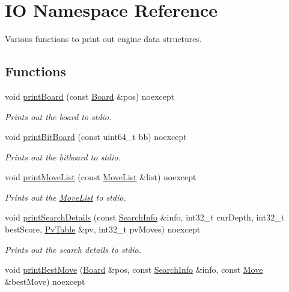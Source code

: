 \hypertarget{namespaceIO}{}\section{IO Namespace Reference}
\label{namespaceIO}


Various functions to print out engine data structures.  


\subsection*{Functions}
\begin{DoxyCompactItemize}
\item 
void \mbox{\hyperlink{namespaceIO_a4a4d2d4f2b6ab5c67e9c087d93db774a}{print\+Board}} (const \mbox{\hyperlink{classBoard}{Board}} \&pos) noexcept
\begin{DoxyCompactList}\small\item\em Prints out the board to stdio. \end{DoxyCompactList}\item 
void \mbox{\hyperlink{namespaceIO_a40b1f9e06e7f1fa9ad6d03382998a704}{print\+Bit\+Board}} (const uint64\+\_\+t bb) noexcept
\begin{DoxyCompactList}\small\item\em Prints out the bitboard to stdio. \end{DoxyCompactList}\item 
void \mbox{\hyperlink{namespaceIO_a34aa1665a2c3f474c1073f0ff9b67db0}{print\+Move\+List}} (const \mbox{\hyperlink{classMoveList}{Move\+List}} \&list) noexcept
\begin{DoxyCompactList}\small\item\em Prints out the \mbox{\hyperlink{classMoveList}{Move\+List}} to stdio. \end{DoxyCompactList}\item 
void \mbox{\hyperlink{namespaceIO_a029095064998d6f3bcf6022cf2876705}{print\+Search\+Details}} (const \mbox{\hyperlink{structSearchInfo}{Search\+Info}} \&info, int32\+\_\+t cur\+Depth, int32\+\_\+t best\+Score, \mbox{\hyperlink{classPvTable}{Pv\+Table}} \&pv, int32\+\_\+t pv\+Moves) noexcept
\begin{DoxyCompactList}\small\item\em Prints out the search details to stdio. \end{DoxyCompactList}\item 
void \mbox{\hyperlink{namespaceIO_a308ab394cf5fd18910986fbe556d01bb}{print\+Best\+Move}} (\mbox{\hyperlink{classBoard}{Board}} \&pos, const \mbox{\hyperlink{structSearchInfo}{Search\+Info}} \&info, const \mbox{\hyperlink{classMove}{Move}} \&best\+Move) noexcept

\end{DoxyCompactItemize}
